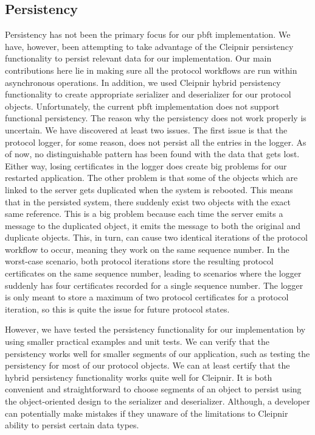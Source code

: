 \subsection{Persistency}
Persistency has not been the primary focus for our \ac{pbft} implementation. We have, however, been attempting to take advantage of the Cleipnir persistency functionality to persist relevant data for our implementation. Our main contributions here lie in making sure all the protocol workflows are run within  asynchronous operations. In addition, we used Cleipnir hybrid persistency functionality to create appropriate serializer and deserializer for our protocol objects.
Unfortunately, the current \ac{pbft} implementation does not support functional persistency. The reason why the persistency does not work properly is uncertain. We have discovered at least two issues. The first issue is that the protocol logger, for some reason, does not persist all the entries in the logger. As of now, no distinguishable pattern has been found with the data that gets lost. Either way, losing certificates in the logger does create big problems for our restarted application. The other problem is that some of the  objects which are linked to the server gets duplicated when the system is rebooted. This means that in the persisted system, there suddenly exist two  objects with the exact same reference. This is a big problem because each time the server emits a message to the duplicated  object, it emits the message to both the original and duplicate  objects. This, in turn, can cause two identical iterations of the protocol workflow to occur, meaning they work on the same sequence number. In the worst-case scenario, both protocol iterations store the resulting protocol certificates on the same sequence number, leading to scenarios where the logger suddenly has four certificates recorded for a single sequence number. The logger is only meant to store a maximum of two protocol certificates for a protocol iteration, so this is quite the issue for future protocol states.

However, we have tested the persistency functionality for our implementation by using smaller practical examples and unit tests. We can verify that the persistency works well for smaller segments of our application, such as testing the persistency for most of our protocol objects.
We can at least certify that the hybrid persistency functionality works quite well for Cleipnir. It is both convenient and straightforward to choose segments of an object to persist using the object-oriented design to the serializer and deserializer. Although, a developer can potentially make mistakes if they unaware of the limitations to Cleipnir ability to persist certain data types.


